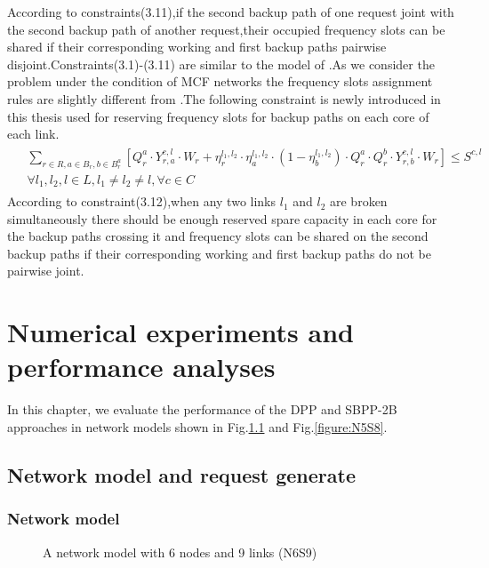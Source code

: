 \documentclass[a4paper,11pt]{report}
\begin{document}
\begin{itemize}
     According to constraints(3.11),if the second backup path of one request joint with the second backup path of another request,their occupied frequency slots can be shared if their corresponding working and first backup paths pairwise disjoint.Constraints(3.1)-(3.11) are similar to the model of \cite{Hong Guo2016}.As we consider the problem under the condition of MCF networks the frequency slots assignment rules are slightly different from \cite{Hong Guo2016}.The following constraint is newly introduced in this thesis used for reserving frequency slots for backup paths on each core of each link.
    \begin{gather}
    \begin{split}
        &\sum\limits_{r \in R,a \in B^{}_r,b \in B^{a}_r} [Q^{a}_r\cdot Y^{c,l}_{r,a}\cdot W^{}_r+ \eta^{l_1,l_2}_r \cdot \eta^{l_1,l_2}_a \cdot (1-\eta^{l_1,l_2}_b) \cdot Q^{a}_r \cdot Q^{b}_r \cdot Y^{c,l}_{r,b} \cdot W^{}_r] \leq S^{c,l}\\
        &\forall{l_1,l_2,l \in L,l_1\neq l_2\neq l},\forall{c \in C} \label{ilp-st}
    \end{split}
    \end{gather}
    According to constraint(3.12),when any two links $l_1$ and $l_2$ are broken simultaneously there should be enough reserved spare capacity in each core for the backup paths crossing it and frequency slots can be shared on the second backup paths if their corresponding working and first backup paths do not be pairwise joint.

\end{itemize}


\chapter{Numerical experiments and performance analyses}
In this chapter, we evaluate the performance of the DPP and SBPP-2B approaches in network models shown in Fig.\ref{figure:N6S9} and Fig.\ref{figure:N5S8}.
\section{Network model and request generate}
\subsection{Network model}
        \begin{figure}[htbp]
        \begin{center}
        \end{center}
        \caption{A network model with 6 nodes and 9 links (N6S9)}
        \label{figure:N6S9}
        \end{figure} 
\end{document}
